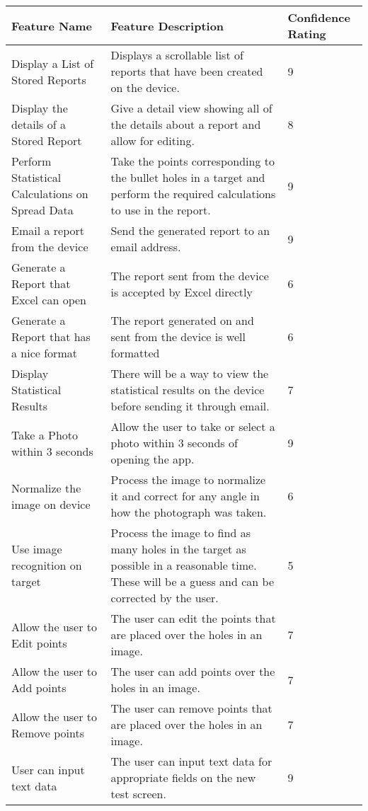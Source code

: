 \documentclass[11pt]{article}
\begin{document}
\begin{center}
\begin{tabular}{| p{4cm} | p{9cm} | p{2cm} |}\hline
\textbf{Feature Name} & \textbf{Feature Description} & \textbf{Confidence Rating}\\\hline\hline
Display a List of Stored Reports & Displays a scrollable list of reports that have been created on the device. & 9\\\hline
Display the details of a Stored Report & Give a detail view showing all of the details about a report and allow for editing. & 8\\\hline
Perform Statistical Calculations on Spread Data & Take the points corresponding to the bullet holes in a target and perform the required calculations to use in the report. & 9\\\hline
Email a report from the device & Send the generated report to an email address. & 9\\\hline
Generate a Report that Excel can open & The report sent from the device is accepted by Excel directly & 6\\\hline
Generate a Report that has a nice format & The report generated on and sent from the device is well formatted & 6\\\hline
Display Statistical Results & There will be a way to view the statistical results on the device before sending it through email. & 7\\\hline
Take a Photo within 3 seconds & Allow the user to take or select a photo within 3 seconds of opening the app. & 9\\\hline
Normalize the image on device & Process the image to normalize it and correct for any angle in how the photograph was taken. & 6\\\hline
Use image recognition on target & Process the image to find as many holes in the target as possible in a reasonable time. These will be a guess and can be corrected by the user. & 5\\\hline
Allow the user to Edit points & The user can edit the points that are placed over the holes in an image. & 7\\\hline
Allow the user to Add points & The user can add points over the holes in an image. & 7\\\hline
Allow the user to Remove points & The user can remove points that are placed over the holes in an image. & 7\\\hline
User can input text data & The user can input text data for appropriate fields on the new test screen. & 9\\\hline
\hline
\end{tabular}
\end{center}
\end{document}
